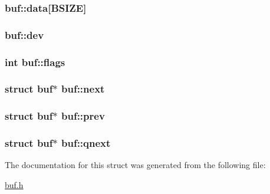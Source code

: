 \subsubsection[{\texorpdfstring{data}{data}}]{ buf\+::data\mbox{[}{\bf B\+S\+I\+ZE}\mbox{]}}\hypertarget{structbuf_ab0ec38784ab94ed35e575cf6d33912d2}{}\label{structbuf_ab0ec38784ab94ed35e575cf6d33912d2}
\subsubsection[{\texorpdfstring{dev}{dev}}]{ buf\+::dev}\hypertarget{structbuf_ac96082c2b5f22133ac7092ef81487227}{}\label{structbuf_ac96082c2b5f22133ac7092ef81487227}
\subsubsection[{\texorpdfstring{flags}{flags}}]{\setlength{\rightskip}{0pt plus 5cm}int buf\+::flags}\hypertarget{structbuf_ae7d6b6c34fdeadb38970efd0554aa1a9}{}\label{structbuf_ae7d6b6c34fdeadb38970efd0554aa1a9}
\subsubsection[{\texorpdfstring{next}{next}}]{\setlength{\rightskip}{0pt plus 5cm}struct {\bf buf}$\ast$ buf\+::next}\hypertarget{structbuf_ab18c18abb22f07617619e9a74c71f51a}{}\label{structbuf_ab18c18abb22f07617619e9a74c71f51a}
\subsubsection[{\texorpdfstring{prev}{prev}}]{\setlength{\rightskip}{0pt plus 5cm}struct {\bf buf}$\ast$ buf\+::prev}\hypertarget{structbuf_a930cab1e1b3751795d31bfd0291dff4a}{}\label{structbuf_a930cab1e1b3751795d31bfd0291dff4a}
\subsubsection[{\texorpdfstring{qnext}{qnext}}]{\setlength{\rightskip}{0pt plus 5cm}struct {\bf buf}$\ast$ buf\+::qnext}\hypertarget{structbuf_aba5c088c4da07a5ec88edfacdae9b85a}{}\label{structbuf_aba5c088c4da07a5ec88edfacdae9b85a}


The documentation for this struct was generated from the following file\+:\begin{DoxyCompactItemize}
\item 
\hyperlink{buf_8h}{buf.\+h}\end{DoxyCompactItemize}
